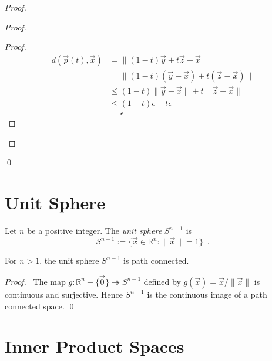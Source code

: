 \begin{proof}
\pf
{}
\begin{proof}
	\begin{proof}
		\pf
		\begin{align*}
			d(\vec{p}(t),\vec{x})
			& = \| (1-t) \vec{y} + t \vec{z} - \vec{x} \| \\
			& = \| (1-t) (\vec{y} - \vec{x}) + t (\vec{z} - \vec{x}) \| \\
			& \leq (1-t) \| \vec{y} - \vec{x} \| + t \| \vec{z} - \vec{x} \| \\
			& \leq (1 - t) \epsilon + t \epsilon \\
			& = \epsilon
		\end{align*}
	\end{proof}
\end{proof}
\qed
\end{proof}

\section{Unit Sphere}

\begin{df}
Let $n$ be a positive integer. The \emph{unit sphere} $S^{n-1}$ is
\[ S^{n-1} := \{ \vec{x} \in \mathbb{R}^n : \| \vec{x} \| = 1 \} \enspace . \]
\end{df}

\begin{prop}
For $n > 1$. the unit sphere $S^{n-1}$ is path connected.
\end{prop}

\begin{proof}
\pf\ The map $g : \mathbb{R}^n - \{\vec{0}\} \twoheadrightarrow S^{n-1}$ defined by $g(\vec{x}) = \vec{x} / \| \vec{x}\|$ is continuous and surjective. Hence $S^{n-1}$ is the continuous image of a path connected space. \qed
\end{proof}

\section{Inner Product Spaces}

